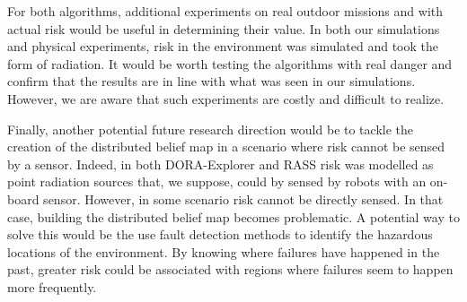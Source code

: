 For both algorithms, additional experiments on real outdoor missions and with actual risk would be useful in determining their value. In both our simulations and physical experiments, risk in the environment was simulated and took the form of radiation. It would be worth testing the algorithms with real danger and confirm that the results are in line with what was seen in our simulations. However, we are aware that such experiments are costly and difficult to realize.

Finally, another potential future research direction would be to tackle the creation of the distributed belief map in a scenario where risk cannot be sensed by a sensor. Indeed, in both DORA-Explorer and RASS risk was modelled as point radiation sources that, we suppose, could by sensed by robots with an on-board sensor. However, in some scenario risk cannot be directly sensed. In that case, building the distributed belief map becomes problematic. A potential way to solve this would be the use fault detection methods to identify the hazardous locations of the environment. By knowing where failures have happened in the past, greater risk could be associated with regions where failures seem to happen more frequently. 

